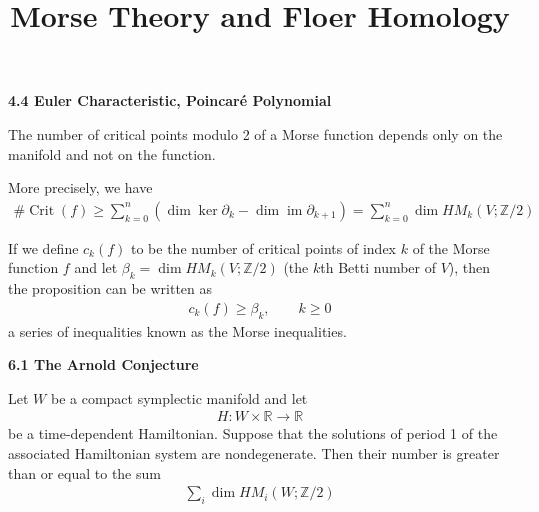 \documentclass[hidelinks, 12pt]{article}
\title{Morse Theory and Floer Homology}
\date{}
\DeclareMathOperator{\Crit}{Crit}
\DeclareMathOperator{\im}{im}
\theoremstyle{mydefstyle}
\theoremstyle{mythmstyle}
\newcounter{prop}
\begin{document}
\pagecolor{white}

\textbf{4.4 Euler Characteristic, Poincar{\'e} Polynomial}

The number of critical points modulo 2 of a Morse function depends only on the manifold and not on the function.

More precisely, we have
\begin{gather*}
\#\Crit(f) \ge \sum_{k = 0}^n \left( \dim \ker \partial_k - \dim \im \partial_{k+1} \right) = \sum_{k = 0}^n \dim HM_k(V; \mathbb{Z}/2)
\end{gather*}

If we define $c_k(f)$ to be the number of critical points of index $k$ of the Morse function $f$ and let $\beta_k = \dim HM_k(V; \mathbb{Z}/2)$ (the $k$th Betti number of $V$), then the proposition can be written as
\begin{gather*}
c_k(f) \ge \beta_k, \qquad k \ge 0
\end{gather*}
a series of inequalities known as the Morse inequalities. 

\textbf{6.1 The Arnold Conjecture}

Let $W$ be a compact symplectic manifold and let
\begin{gather*}
H : W \times \mathbb{R} \to \mathbb{R}
\end{gather*}
be a time-dependent Hamiltonian. Suppose that the solutions of period 1 of the associated Hamiltonian system are nondegenerate. Then their number is greater than or equal to the sum
\begin{gather*}
\sum_i \dim HM_i(W; \mathbb{Z}/2)
\end{gather*}
\end{document}
